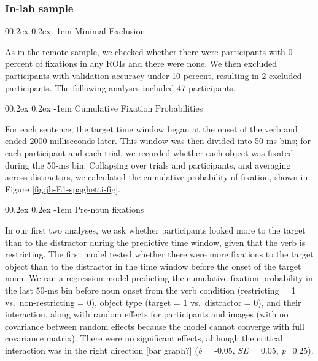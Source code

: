 \documentclass[
  man,floatsintext]{apa6}
\makeatletter
\let\oldparagraph\paragraph
\renewcommand{\paragraph}[1]{\oldparagraph{#1}\mbox{}}
\renewcommand{\paragraph}{\@startsection{paragraph}{4}{\parindent}%
  {0\baselineskip \@plus 0.2ex \@minus 0.2ex}%
  {-1em}%
  {\normalfont\normalsize\bfseries\itshape\typesectitle}}
\makeatother
\begin{document}
\hypertarget{in-lab-sample-1}{%
\subsubsection{In-lab sample}\label{in-lab-sample-1}}

\hypertarget{minimal-exclusion-1}{%
\paragraph{Minimal Exclusion}\label{minimal-exclusion-1}}

As in the remote sample, we checked whether there were participants with 0 percent of fixations in any ROIs and there were none. We then excluded participants with validation accuracy under 10 percent, resulting in 2 excluded participants. The following analyses included 47 participants.

\hypertarget{cumulative-fixation-probabilities-1}{%
\paragraph{Cumulative Fixation Probabilities}\label{cumulative-fixation-probabilities-1}}

For each sentence, the target time window began at the onset of the verb and ended 2000 milliseconds later. This window was then divided into 50-ms bins; for each participant and each trial, we recorded whether each object was fixated during the 50-ms bin. Collapsing over trials and participants, and averaging across distractors, we calculated the cumulative probability of fixation, shown in Figure \ref{fig:jh-E1-spaghetti-fig}.

\hypertarget{pre-noun-fixations-1}{%
\paragraph{Pre-noun fixations}\label{pre-noun-fixations-1}}

In our first two analyses, we ask whether participants looked more to the target than to the distractor during the predictive time window, given that the verb is restricting. The first model tested whether there were more fixations to the target object than to the distractor in the time window before the onset of the target noun. We ran a regression model predicting the cumulative fixation probability in the last 50-ms bin before noun onset from the verb condition (restricting = 1 vs.~non-restricting = 0), object type (target = 1 vs.~distractor = 0), and their interaction, along with random effects for participants and images (with no covariance between random effects because the model cannot converge with full covariance matrix). There were no significant effects, although the critical interaction was in the right direction {[}bar graph?{]} (\emph{b} = -0.05, \emph{SE} = 0.05, \emph{p}=0.25).
\end{document}
